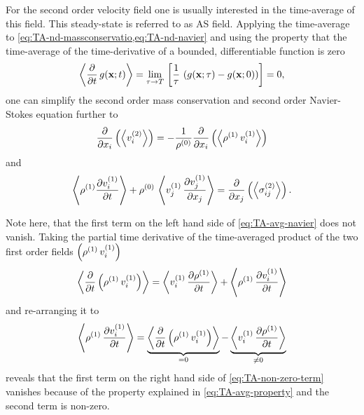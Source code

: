 For the second order velocity field one is usually interested in the 
time-average of this field. This steady-state is referred to as AS field. 
Applying the time-average to \cref{eq:TA-nd-massconservatio,eq:TA-nd-navier} 
and using the property that the time-average of the time-derivative of a 
bounded, differentiable function is zero~\cite{Baasch2020}
\begin{equation}
  \left\langle \pdv{t}\,g(\vb{x};t) \right\rangle = \lim\limits_{\tau \rightarrow T}{\,
    \left[ \frac{1}{\tau}\,\left( g(\vb{x}; \tau) - g(\vb{x}; 0) \right) 
  \right]} = 0,
  \label{eq:TA-avg-property}
\end{equation}
one can simplify the second order mass conservation and second order 
Navier-Stokes equation further to
\begin{equation}
  \pdv{x_{i}}\left( \left\langle v_{i}^{(2)} \right\rangle \right) = 
  -\frac{1}{\rho^{(0)}} \pdv{x_{i}}\left(\left\langle  
  \rho^{(1)}\,v_{i}^{(1)}  \right\rangle\right)
  \label{eq:TA-avg-massconservatio}
\end{equation}
and
\begin{equation}
  \left\langle \rho^{(1)} \pdv{  v_{i}^{(1)}  }{t} \right\rangle + 
  \rho^{(0)}\,\left\langle v_{j}^{(1)}\,\pdv{  v_{j}^{(1)}  }{x_{j}} \right\rangle 
  = \pdv{x_{j}}\left( \left\langle \sigma_{ij}^{(2)} \right\rangle \right).
  \label{eq:TA-avg-navier}
\end{equation}

Note here, that the first term on the left hand side of \cref{eq:TA-avg-navier} 
does not vanish. Taking the partial time derivative of the time-averaged 
product of the two first order fields 
$\left(\rho^{(1)}\,v_{i}^{(1)}\right)$
\begin{equation}
  \left\langle \pdv{t}\left( \rho^{(1)}\,v_{i}^{(1)} \right) \right\rangle
  =
  \left\langle v_{i}^{(1)}\,\pdv{  \rho^{(1)}  }{t} \right\rangle
  +
  \left\langle \rho^{(1)}\,\pdv{  v_{i}^{(1)}  }{t} \right\rangle
\end{equation}
and re-arranging it to
\begin{equation}
  \left\langle \rho^{(1)}\,\pdv{  v_{i}^{(1)}  }{t} \right\rangle
  =
  \underbrace{
  \left\langle \pdv{t}\left( \rho^{(1)}\,v_{i}^{(1)} \right) \right\rangle
}_{=0}
  -
  \underbrace{
  \left\langle v_{i}^{(1)}\,\pdv{  \rho^{(1)}  }{t} \right\rangle
}_{\neq 0}
  \label{eq:TA-non-zero-term}
\end{equation}
reveals that the first term on the right hand side of 
\cref{eq:TA-non-zero-term} vanishes because of the property explained in 
\cref{eq:TA-avg-property} and the second term is non-zero.

